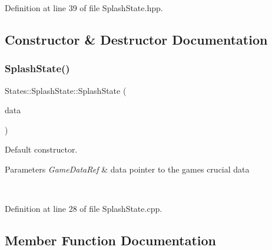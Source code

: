 \begin{DoxyVerb}\end{DoxyVerb}
 

Definition at line 39 of file Splash\+State.\+hpp.



\subsection{Constructor \& Destructor Documentation}
\mbox{\label{class_states_1_1_splash_state_a9f8047d3c5043ae63c4f82dfd9363149}} 
\subsubsection{\texorpdfstring{SplashState()}{SplashState()}}
{\footnotesize\ttfamily States\+::\+Splash\+State\+::\+Splash\+State (\begin{DoxyParamCaption}\item[{\mbox{\hyperlink{namespace_arktis_engine_a52e783ae007274e2a6eccc201d9400a5}{Arktis\+Engine\+::\+Game\+Data\+Ref}}}]{data }\end{DoxyParamCaption})}



Default constructor. 


\begin{DoxyParams}{Parameters}
{\em Game\+Data\+Ref} & data pointer to the game\textquotesingle{}s crucial data \begin{DoxyVerb}\end{DoxyVerb}
 \\
\hline
\end{DoxyParams}


Definition at line 28 of file Splash\+State.\+cpp.


\begin{DoxyCode}{0}

\end{DoxyCode}


\subsection{Member Function Documentation}
\mbox{\label{class_states_1_1_splash_state_adae0af95808a668cd29b537d7126735f}} 
